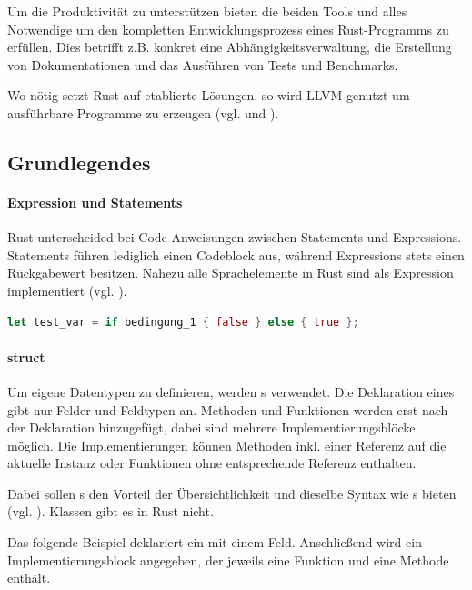 \documentclass[11pt,a4paper, ngerman]{article}
\begin{document}
Um die Produktivität zu unterstützen bieten die beiden Tools  und  alles Notwendige um den kompletten Entwicklungsprozess eines Rust-Programms zu erfüllen. Dies betrifft z.B. konkret eine Abhängigkeitsverwaltung, die Erstellung von Dokumentationen und das Ausführen von Tests und Benchmarks.

Wo nötig setzt Rust auf etablierte Lösungen, so wird LLVM genutzt um ausführbare Programme zu erzeugen (vgl. \cite{RustcCodegen2} und \cite{RustcCodegen}).

\subsection{Grundlegendes}
\paragraph{Expression und Statements} Rust unterscheided bei Code-Anweisungen zwischen Statements und Expressions. Statements führen lediglich einen Codeblock aus, während Expressions stets einen Rückgabewert besitzen. Nahezu alle Sprachelemente in Rust sind als Expression implementiert (vgl. \cite[S. 122 ff.]{BO18}).

\begin{lstlisting}[language=rust, caption={Expression Einführendes Beispiel:}]
    let test_var = if bedingung_1 { false } else { true };
\end{lstlisting}

\paragraph{struct} Um eigene Datentypen zu definieren, werden s verwendet. Die Deklaration eines  gibt nur Felder und Feldtypen an. Methoden und Funktionen werden erst nach der Deklaration hinzugefügt, dabei sind mehrere Implementierungsblöcke möglich. Die Implementierungen können Methoden inkl. einer Referenz auf die aktuelle Instanz oder Funktionen ohne entsprechende Referenz enthalten.

Dabei sollen s den Vorteil der Übersichtlichkeit und dieselbe Syntax wie s bieten (vgl. \cite[S. 91]{BO18}). Klassen gibt es in Rust nicht.

Das folgende Beispiel deklariert ein  mit einem Feld. Anschließend wird ein Implementierungsblock angegeben, der jeweils eine Funktion und eine Methode enthält.
\end{document}
